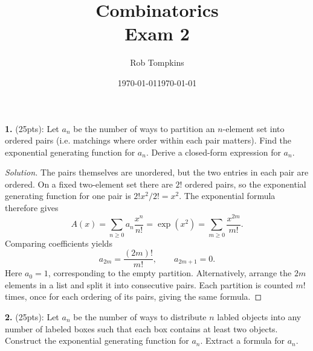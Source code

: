 \documentclass[12pt]{amsart}
\title{Combinatorics\\Exam 2}
\author{Rob Tompkins}
\date{\today}
\newenvironment{solution}
{\begin{proof}[Solution]}
{\end{proof}}
\begin{document}
    \maketitle
    \date{\today}
    \begin{onehalfspace}
        \noindent\textbf{1.} (25pts): Let $a_n$ be the number of ways to partition an $n$-element
        set into ordered pairs (i.e. matchings where order within each pair matters).
        Find the exponential generating function for $a_n$.
        Derive a closed-form expression for $a_n$.

        \begin{solution}
            The pairs themselves are unordered, but the two entries in each
            pair are ordered.  On a fixed two-element set there are $2!$
            ordered pairs, so the exponential generating function for one
            pair is $2!x^2/2!=x^2$.  The exponential formula therefore gives
            \[
                A(x)=\sum_{n\ge0}a_n\frac{x^n}{n!}
                =\exp(x^2)=\sum_{m\ge0}\frac{x^{2m}}{m!}.
            \]
            Comparing coefficients yields
            \[
                a_{2m}=\frac{(2m)!}{m!},\qquad a_{2m+1}=0.
            \]
            Here $a_0=1$, corresponding to the empty partition.  Alternatively,
            arrange the $2m$ elements in a list and split it into consecutive
            pairs.  Each partition is counted $m!$ times, once for each
            ordering of its pairs, giving the same formula.
        \end{solution}

        \noindent\textbf{2.} (25pts): Let $a_n$ be the number of ways to distribute $n$ labled
        objects into any number of labeled boxes such that each box contains at least two
        objects.
        Construct the exponential generating function for $a_n$.
        Extract a formula for $a_n$.


\end{onehalfspace}
\end{document}
